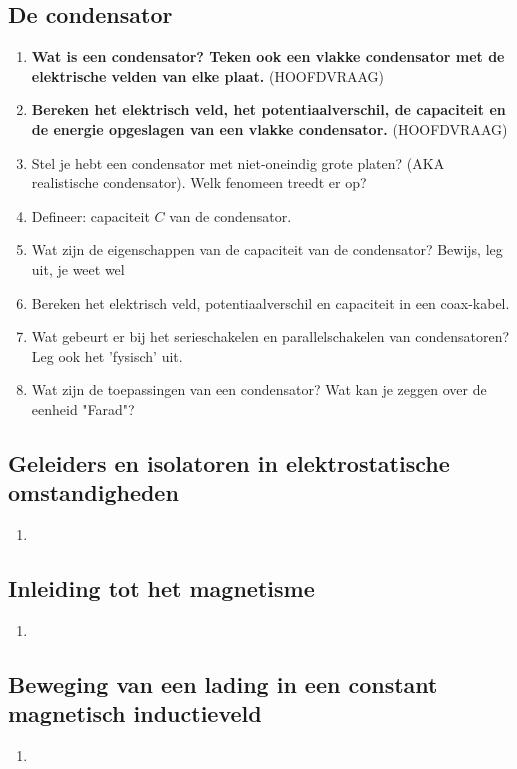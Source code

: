 \documentclass[12pt]{article}
\begin{document}
    \subsection{De condensator}
    \begin{enumerate}
        \item \textbf{Wat is een condensator? Teken ook een vlakke condensator met de elektrische velden van elke plaat.} (HOOFDVRAAG)
        \item \textbf{Bereken het elektrisch veld, het potentiaalverschil, de capaciteit en de energie opgeslagen van een vlakke condensator.} (HOOFDVRAAG)
        \item Stel je hebt een condensator met niet-oneindig grote platen? (AKA realistische condensator). Welk fenomeen treedt er op?
        \item Defineer: capaciteit $C$ van de condensator.
        \item Wat zijn de eigenschappen van de capaciteit van de condensator? Bewijs, leg uit, je weet wel
        \item Bereken het elektrisch veld, potentiaalverschil en capaciteit in een coax-kabel.
        \item Wat gebeurt er bij het serieschakelen en parallelschakelen van condensatoren? Leg ook het 'fysisch' uit.
        \item Wat zijn de toepassingen van een condensator? Wat kan je zeggen over de eenheid "Farad"?
    \end{enumerate}
    \subsection{Geleiders en isolatoren in elektrostatische omstandigheden}
    \begin{enumerate}
        \item 
    \end{enumerate}
    \subsection{Inleiding tot het magnetisme}
    \begin{enumerate}
        \item 
    \end{enumerate}
    \subsection{Beweging van een lading in een constant magnetisch inductieveld}
    \begin{enumerate}
        \item 
    \end{enumerate}
\end{document}
